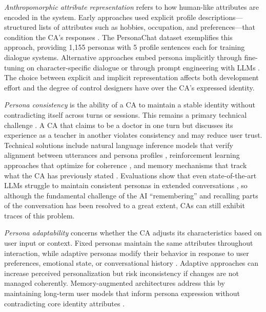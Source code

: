 \documentclass[manuscript,anonymous,sigconf]{acmart}
\begin{document}
\textit{Anthropomorphic attribute representation} refers to how human-like attributes are encoded in the system. Early approaches used explicit profile descriptions---structured lists of attributes such as hobbies, occupation, and preferences---that condition the CA's responses \citep{zhang2018personalizing}. The PersonaChat dataset exemplifies this approach, providing 1,155 personas with 5 profile sentences each for training dialogue systems. Alternative approaches embed persona implicitly through fine-tuning on character-specific dialogue \citep{shuster2019dialogue} or through prompt engineering with LLMs \citep{jandaghi2023faithful}. The choice between explicit and implicit representation affects both development effort and the degree of control designers have over the CA's expressed identity.

\textit{Persona consistency} is the ability of a CA to maintain a stable identity without contradicting itself across turns or sessions. This remains a primary technical challenge \citep{song2020generating}. A CA that claims to be a doctor in one turn but discusses its experience as a teacher in another violates consistency and may reduce user trust. Technical solutions include natural language inference models that verify alignment between utterances and persona profiles \citep{welleck2019dialogue}, reinforcement learning approaches that optimize for coherence \citep{song2021bob}, and memory mechanisms that track what the CA has previously stated \citep{xu2022beyond}. Evaluations show that even state-of-the-art LLMs struggle to maintain consistent personas in extended conversations \citep{maharana2024evaluating}, so although the fundamental challenge \citep{turing_computing_1950} of the AI ``remembering'' and recalling parts of the conversation has been resolved to a great extent, CAs can still exhibit traces of this problem.

\textit{Persona adaptability} concerns whether the CA adjusts its characteristics based on user input or context. Fixed personas maintain the same attributes throughout interaction, while adaptive personas modify their behavior in response to user preferences, emotional state, or conversational history \citep{huang2023personalized}. Adaptive approaches can increase perceived personalization but risk inconsistency if changes are not managed coherently. Memory-augmented architectures address this by maintaining long-term user models that inform persona expression without contradicting core identity attributes \citep{xu2022beyond,zhong_memorybank_2024}.
\end{document}
